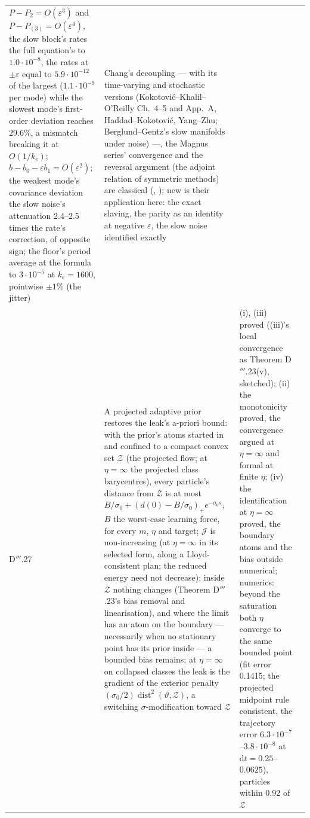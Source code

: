 {\begin{longtable}{@{}>{\raggedright\arraybackslash}p{}>{\raggedright\arraybackslash}p{}%
>{\raggedright\arraybackslash}p{}>{\raggedright\arraybackslash}p{}@{}}
$P - P_2 = O(\varepsilon^3)$ and $P - P_{(3)} = O(\varepsilon^4)$, the slow block's rates the full equation's to
$1.0\cdot10^{-8}$, the rates at $\pm\varepsilon$ equal to $5.9\cdot10^{-12}$ of the largest ($1.1\cdot10^{-9}$ per
mode) while the slowest mode's first-order deviation reaches 29.6\%, a mismatch breaking it at $O(1/k_e)$;
$b - b_0 - \varepsilon b_1 = O(\varepsilon^2)$; the weakest mode's covariance deviation the slow noise's attenuation
2.4--2.5 times the rate's correction, of opposite sign; the floor's period average at the formula to $3\cdot10^{-5}$
at $k_e = 1600$, pointwise $\pm1\%$ (the jitter)
& Chang's decoupling --- with its time-varying and stochastic versions (Kokotovi\'c--Khalil--O'Reilly Ch.~4--5 and
App.~A, Haddad--Kokotovi\'c, Yang--Zhu; Berglund--Gentz's slow manifolds under noise) ---, the Magnus series'
convergence and the reversal argument (the adjoint relation of symmetric methods) are classical (\cite{S59},
\cite{S56}); new is their application here: the exact slaving, the parity as an identity at negative $\varepsilon$,
the slow noise identified exactly\\
\addlinespace[0.5pt]
D$'''$.27 & A projected adaptive prior restores the leak's a-priori bound: with the prior's atoms started in and
confined to a compact convex set $\mathcal{Z}$ (the projected flow; at $\eta = \infty$ the projected class
barycentres), every particle's distance from $\mathcal{Z}$ is at most
$B/\sigma_0 + (d(0) - B/\sigma_0)_+e^{-\sigma_0s}$, $B$ the worst-case learning force, for every $m$, $\eta$ and
target; $\mathcal{J}$ is non-increasing (at $\eta = \infty$ in its selected form, along a Lloyd-consistent plan; the
reduced energy need not decrease); inside $\mathcal{Z}$ nothing changes (Theorem D$'''$.23's bias removal and
linearisation), and where the limit has an atom on the boundary --- necessarily when no stationary point has its
prior inside --- a bounded bias remains; at $\eta = \infty$ on collapsed classes the leak is the gradient of the
exterior penalty $(\sigma_0/2)\operatorname{dist}^2(\vartheta,\mathcal{Z})$, a switching $\sigma$-modification toward
$\mathcal{Z}$
& (i), (iii) proved ((iii)'s local convergence as Theorem D$'''$.23(v), sketched); (ii) the monotonicity proved, the
convergence argued at $\eta = \infty$ and formal at finite $\eta$; (iv) the identification at $\eta = \infty$ proved,
the boundary atoms and the bias outside numerical; numerics: beyond the saturation both $\eta$ converge to the same
bounded point (fit error 0.1415; the projected midpoint rule consistent, the trajectory error
$6.3\cdot10^{-7}$--$3.8\cdot10^{-8}$ at $\mathrm{d}t = 0.25$--$0.0625$), particles within 0.92 of $\mathcal{Z}$

\end{longtable}}
